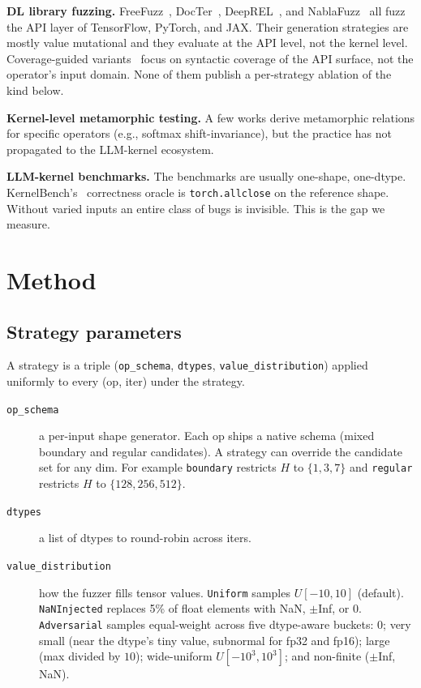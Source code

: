 \documentclass[runningheads]{llncs}
\begin{document}
\textbf{DL library fuzzing.} FreeFuzz~\cite{freefuzz2022},
DocTer~\cite{docter2022}, DeepREL~\cite{deeprel2022}, and
NablaFuzz~\cite{nablafuzz2023} all fuzz the API layer of TensorFlow,
PyTorch, and JAX. Their generation strategies are mostly value
mutational and they evaluate at the API level, not the kernel level.
Coverage-guided variants~\cite{flashfuzz2025} focus on syntactic
coverage of the API surface, not the operator's input domain. None of
them publish a per-strategy ablation of the kind below.

\textbf{Kernel-level metamorphic testing.} A few works derive
metamorphic relations for specific operators (e.g., softmax
shift-invariance), but the practice has not propagated to the LLM-kernel
ecosystem.

\textbf{LLM-kernel benchmarks.} The benchmarks
\cite{kernelbench2025,geak2025,kernelband2025,stark2025,kernelbenchx2026}
are usually one-shape, one-dtype. KernelBench's~\cite{kernelbench2025}
correctness oracle is \texttt{torch.allclose} on the reference shape.
Without varied inputs an entire class of bugs is invisible. This is
the gap we measure.

\section{Method}
\label{sec:method}

\subsection{Strategy parameters}
\label{sec:method:strategy}

A strategy is a triple (\texttt{op\_schema}, \texttt{dtypes},
\texttt{value\_distribution}) applied uniformly to every (op, iter)
under the strategy.

{\sloppy
\begin{description}
\item[\texttt{op\_schema}] a per-input shape generator. Each op ships a
native schema (mixed boundary and regular candidates). A strategy can
override the candidate set for any dim. For example \texttt{boundary}
restricts $H$ to $\{1, 3, 7\}$ and \texttt{regular} restricts $H$ to
$\{128, 256, 512\}$.
\item[\texttt{dtypes}] a list of dtypes to round-robin across iters.
\item[\texttt{value\_distribution}] how the fuzzer fills tensor
values. \texttt{Uniform} samples $U[-10, 10]$ (default).
\texttt{NaNInjected} replaces 5\% of float elements with NaN,
$\pm$Inf, or 0. \texttt{Adversarial} samples equal-weight across
five dtype-aware buckets: $0$; very small (near the dtype's tiny
value, subnormal for fp32 and fp16); large (max divided by $10$);
wide-uniform $U[-10^3, 10^3]$; and non-finite ($\pm$Inf, NaN).
\end{description}
\par}
\end{document}
